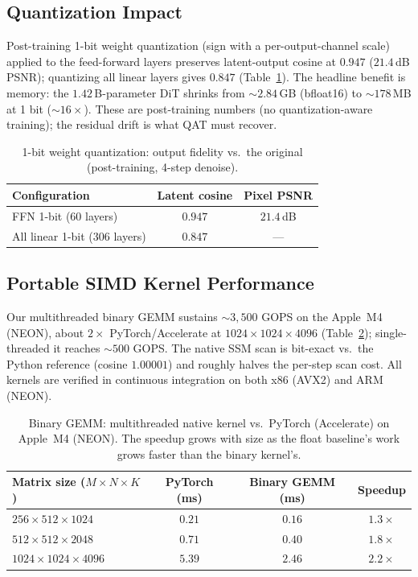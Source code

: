 \documentclass[11pt]{article}
\begin{document}
\subsection{Quantization Impact}

Post-training 1-bit weight quantization (sign with a per-output-channel scale)
applied to the feed-forward layers preserves latent-output cosine at $0.947$
($21.4$\,dB PSNR); quantizing all linear layers gives $0.847$
(Table~\ref{tab:quant}). The headline benefit is memory: the $1.42$\,B-parameter
DiT shrinks from ${\sim}2.84$\,GB (bfloat16) to ${\sim}178$\,MB at 1 bit
(${\sim}16\times$). These are post-training numbers (no quantization-aware
training); the residual drift is what QAT must recover.

\begin{table}[h]
\centering
\caption{1-bit weight quantization: output fidelity vs.\ the original
(post-training, 4-step denoise).}
\label{tab:quant}
\begin{tabular}{@{}lcc@{}}
\toprule
Configuration & Latent cosine & Pixel PSNR \\
\midrule
FFN 1-bit (60 layers) & $0.947$ & $21.4$\,dB \\
All linear 1-bit (306 layers) & $0.847$ & --- \\
\bottomrule
\end{tabular}
\end{table}

\subsection{Portable SIMD Kernel Performance}

Our multithreaded binary GEMM sustains ${\sim}3{,}500$ GOPS on the Apple~M4
(NEON), about $2\times$ PyTorch/Accelerate at $1024{\times}1024{\times}4096$
(Table~\ref{tab:gemm}); single-threaded it reaches ${\sim}500$ GOPS. The native
SSM scan is bit-exact vs.\ the Python reference (cosine $1.00001$) and roughly
halves the per-step scan cost. All kernels are verified in continuous integration
on both x86 (AVX2) and ARM (NEON).

\begin{table}[h]
\centering
\caption{Binary GEMM: multithreaded native kernel vs.\ PyTorch (Accelerate) on
Apple~M4 (NEON). The speedup grows with size as the float baseline's work grows
faster than the binary kernel's.}
\label{tab:gemm}
\begin{tabular}{@{}lccc@{}}
\toprule
Matrix size ($M{\times}N{\times}K$) & PyTorch (ms) & Binary GEMM (ms) & Speedup \\
\midrule
$256{\times}512{\times}1024$ & $0.21$ & $0.16$ & $1.3\times$ \\
$512{\times}512{\times}2048$ & $0.71$ & $0.40$ & $1.8\times$ \\
$1024{\times}1024{\times}4096$ & $5.39$ & $2.46$ & $2.2\times$ \\
\bottomrule
\end{tabular}
\end{table}
\end{document}
